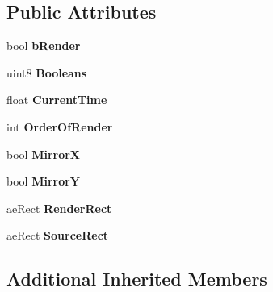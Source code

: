\subsection*{Public Attributes}
\begin{DoxyCompactItemize}
\item 
bool {\bfseries b\+Render}\hypertarget{class_c_animation_renderer_a3bb59d43ab8359500e5bd613cda99d50}{}\label{class_c_animation_renderer_a3bb59d43ab8359500e5bd613cda99d50}

\item 
uint8 {\bfseries Booleans}\hypertarget{class_c_animation_renderer_ab8ca07f77bb885dab14185ab31e6228e}{}\label{class_c_animation_renderer_ab8ca07f77bb885dab14185ab31e6228e}

\item 
float {\bfseries Current\+Time}\hypertarget{class_c_animation_renderer_ab36e10f877667f709d67d6f9d7bc9f11}{}\label{class_c_animation_renderer_ab36e10f877667f709d67d6f9d7bc9f11}

\item 
int {\bfseries Order\+Of\+Render}\hypertarget{class_c_animation_renderer_ab68b3daafdbbd9f33ec77b48384a7c00}{}\label{class_c_animation_renderer_ab68b3daafdbbd9f33ec77b48384a7c00}

\item 
bool {\bfseries MirrorX}\hypertarget{class_c_animation_renderer_a6417db8dcc583037136cc73c844817dd}{}\label{class_c_animation_renderer_a6417db8dcc583037136cc73c844817dd}

\item 
bool {\bfseries MirrorY}\hypertarget{class_c_animation_renderer_abbd0cd3acddcc7a3bfe38e2583ef30ca}{}\label{class_c_animation_renderer_abbd0cd3acddcc7a3bfe38e2583ef30ca}

\item 
ae\+Rect {\bfseries Render\+Rect}\hypertarget{class_c_animation_renderer_add36bcb728961d5f19254fe78eab7d50}{}\label{class_c_animation_renderer_add36bcb728961d5f19254fe78eab7d50}

\item 
ae\+Rect {\bfseries Source\+Rect}\hypertarget{class_c_animation_renderer_a167120445e1689108f12f6edcd2ed1c5}{}\label{class_c_animation_renderer_a167120445e1689108f12f6edcd2ed1c5}

\end{DoxyCompactItemize}
\subsection*{Additional Inherited Members}


